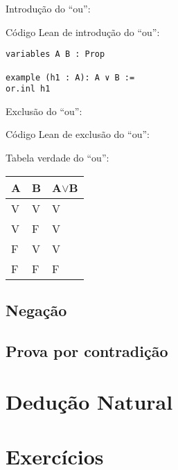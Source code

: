 Introdução do ``ou'':
\begin{prooftree}
\end{prooftree}

Código Lean de introdução do ``ou'':
\begin{lstlisting} 
variables A B : Prop

example (h1 : A): A ∨ B :=
or.inl h1
\end{lstlisting} 

Exclusão do ``ou'': 


  \begin{prooftree}
     \end{prooftree}
     
Código Lean de exclusão do ``ou'':

Tabela verdade do ``ou'':


\begin{table}[htb]
\begin{tabular}{|l|l|l|}
\hline
\textbf{A} & \textbf{B} & \textbf{A$\lor$B} \\ \hline
V          & V          & V                 \\ \hline
V          & F          & V                 \\ \hline
F          & V          & V                 \\ \hline
F          & F          & F                 \\ \hline
\end{tabular}
\end{table}




\subsection{Negação}
\subsection{Prova por contradição}

\section{Dedução Natural}

\section{Exercícios}
